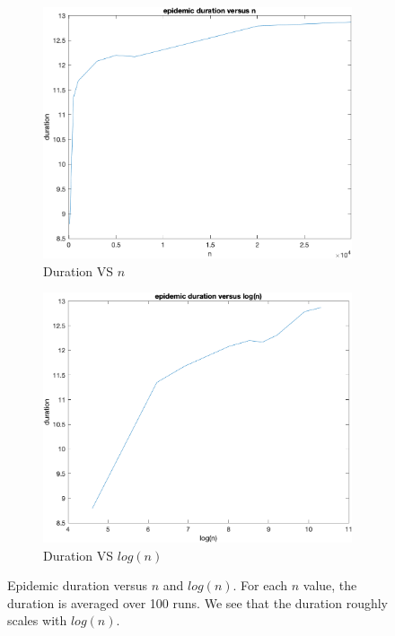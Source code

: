 \documentclass{article}
\begin{document}
\begin{figure} 
	\begin{subfigure}[b]{.5\linewidth}
		\centering\large 	\includegraphics[width=\linewidth]{figs/Q4_duration_n.png}
		\caption{Duration VS $ n $}\label{fig: Q4_duration_1} 
	\end{subfigure}%
	\begin{subfigure}[b]{.5\linewidth}
	\centering\large 	\includegraphics[width=\linewidth]{figs/Q4_duration.png}
	\caption{Duration VS $ log(n) $}\label{fig: Q4_duration_2}
	\end{subfigure}
\caption{Epidemic duration versus $ n $ and $ log(n) $. For each $ n $ value, the duration is averaged over 100 runs. We see that the duration roughly scales with $ log(n) $.}\label{fig: Q4_duration}
\end{figure}
\end{document}
